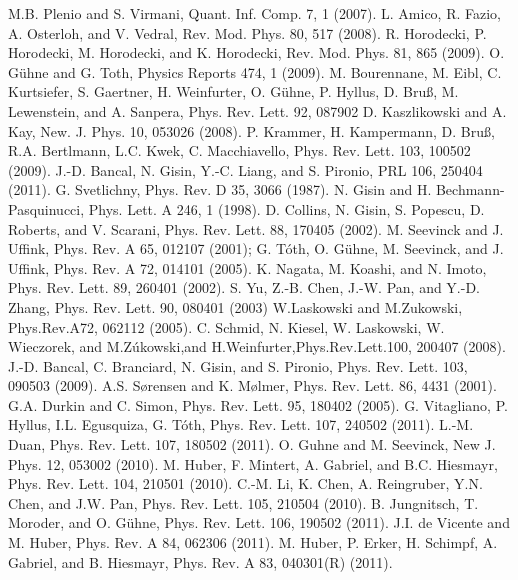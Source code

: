 \begin{thebibliography}{}
 M.B. Plenio and S. Virmani, Quant. Inf. Comp. 7, 1 (2007).
 L. Amico, R. Fazio, A. Osterloh, and V. Vedral, Rev. Mod. Phys. 80, 517 (2008).
 R. Horodecki, P. Horodecki, M. Horodecki, and K. Horodecki, Rev. Mod. Phys. 81, 865 (2009).
 O. G\"uhne and G. Toth, Physics Reports 474, 1 (2009). 
 M. Bourennane, M. Eibl, C. Kurtsiefer, S. Gaertner, H. Weinfurter, O. G\"uhne, P. Hyllus, D. Bruß, M. Lewenstein, and A. Sanpera, Phys. Rev. Lett. 92, 087902
 D. Kaszlikowski and A. Kay, New. J. Phys. 10, 053026 (2008).
 P. Krammer, H. Kampermann, D. Bruß, R.A. Bertlmann, L.C. Kwek, C. Macchiavello, Phys. Rev. Lett. 103, 100502 (2009).
 J.-D. Bancal, N. Gisin, Y.-C. Liang, and S. Pironio, PRL 106, 250404 (2011).
 G. Svetlichny, Phys. Rev. D 35, 3066 (1987).
 N. Gisin and H. Bechmann-Pasquinucci, Phys. Lett. A 246, 1 (1998).
 D. Collins, N. Gisin, S. Popescu, D. Roberts, and V. Scarani, Phys. Rev. Lett. 88, 170405 (2002).
 M. Seevinck and J. Uffink, Phys. Rev. A 65, 012107 (2001); 
 G. T\'oth, O. G\"uhne, M. Seevinck, and J. Uffink, Phys. Rev. A 72, 014101 (2005).
 K. Nagata, M. Koashi, and N. Imoto, Phys. Rev. Lett. 89, 260401 (2002).
 S. Yu, Z.-B. Chen, J.-W. Pan, and Y.-D. Zhang, Phys. Rev. Lett. 90, 080401 (2003)
 W.Laskowski and M.Zukowski, Phys.Rev.A72, 062112 (2005).
 C. Schmid, N. Kiesel, W. Laskowski, W. Wieczorek, and M.Z\'ukowski,and H.Weinfurter,Phys.Rev.Lett.100, 200407 (2008).
 J.-D. Bancal, C. Branciard, N. Gisin, and S. Pironio, Phys. Rev. Lett. 103, 090503 (2009).
 A.S. Sørensen and K. Mølmer, Phys. Rev. Lett. 86, 4431 (2001).
 G.A. Durkin and C. Simon, Phys. Rev. Lett. 95, 180402 (2005).
 G. Vitagliano, P. Hyllus, I.L. Egusquiza, G. T\'oth, Phys. Rev. Lett. 107, 240502 (2011).
 L.-M. Duan, Phys. Rev. Lett. 107, 180502 (2011).
 O. Guhne and M. Seevinck, New J. Phys. 12, 053002 (2010).
 M. Huber, F. Mintert, A. Gabriel, and B.C. Hiesmayr, Phys. Rev. Lett. 104, 210501 (2010).
 C.-M. Li, K. Chen, A. Reingruber, Y.N. Chen, and J.W. Pan, Phys. Rev. Lett. 105, 210504 (2010).
 B. Jungnitsch, T. Moroder, and O. G\"uhne, Phys. Rev. Lett. 106, 190502 (2011).
 J.I. de Vicente and M. Huber, Phys. Rev. A 84, 062306 (2011).
 M. Huber, P. Erker, H. Schimpf, A. Gabriel, and B. Hiesmayr, Phys. Rev. A 83, 040301(R) (2011).



\end{thebibliography}
